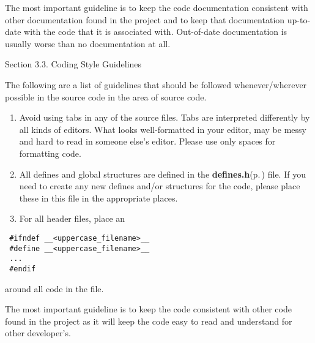 \begin{Desc}
\item[]The most important guideline is to keep the code documentation consistent with other documentation found in the project and to keep that documentation up-to-date with the code that it is associated with. Out-of-date documentation is usually worse than no documentation at all.\end{Desc}




\begin{Desc}
\item[Section 3.3. Coding Style Guidelines]\end{Desc}
\begin{Desc}
\item[]The following are a list of guidelines that should be followed whenever/wherever possible in the source code in the area of source code.\end{Desc}
\begin{Desc}
\item[]\begin{enumerate}
\item Avoid using tabs in any of the source files. Tabs are interpreted differently by all kinds of editors. What looks well-formatted in your editor, may be messy and hard to read in someone else's editor. Please use only spaces for formatting code. \item All defines and global structures are defined in the {\bf defines.h}{\rm (p.\,\pageref{defines_8h})} file. If you need to create any new defines and/or structures for the code, please place these in this file in the appropriate places. \item For all header files, place an \end{enumerate}
\end{Desc}


\footnotesize\begin{verbatim} #ifndef __<uppercase_filename>__
 #define __<uppercase_filename>__
 ...
 #endif
\end{verbatim}\normalsize


\begin{Desc}
\item[]around all code in the file.\end{Desc}
\begin{Desc}
\item[]The most important guideline is to keep the code consistent with other code found in the project as it will keep the code easy to read and understand for other developer's.\end{Desc}




